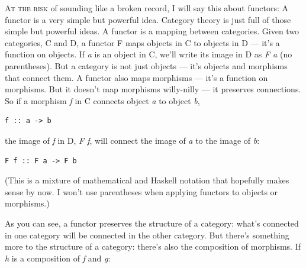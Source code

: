 \lettrine[lhang=0.17]{A}{t the risk} of sounding like a broken record, I will say this about
functors: A functor is a very simple but powerful idea. Category theory
is just full of those simple but powerful ideas. A functor is a mapping
between categories. Given two categories, C and D, a functor F maps
objects in C to objects in D --- it's a function on objects. If \emph{a}
is an object in C, we'll write its image in D as \emph{F a} (no
parentheses). But a category is not just objects --- it's objects and
morphisms that connect them. A functor also maps morphisms --- it's a
function on morphisms. But it doesn't map morphisms willy-nilly --- it
preserves connections. So if a morphism \emph{f} in C connects object
\emph{a} to object \emph{b},

\begin{verbatim}
f :: a -> b
\end{verbatim}
the image of \emph{f} in D, \emph{F f}, will connect the image of
\emph{a} to the image of \emph{b}:

\begin{verbatim}
F f :: F a -> F b
\end{verbatim}
(This is a mixture of mathematical and Haskell notation that hopefully
makes sense by now. I won't use parentheses when applying functors to
objects or morphisms.)

\begin{figure}[H]
\centering
{}
\end{figure}

\noindent
As you can see, a
functor preserves the structure of a category: what's connected in one
category will be connected in the other category. But there's something
more to the structure of a category: there's also the composition of
morphisms. If \emph{h} is a composition of \emph{f} and \emph{g}:

